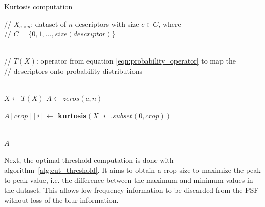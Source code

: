 \begin{algorithm}[H]
	\caption{Kurtosis computation}
	\label{alg:kurtosis_array}
	\begin{algorithmic}[1]
	    \State // $X_{c \times n}$: dataset of $n$ descriptors with size $c \in C$, where \\ // $C = \{0,1,...,size(descriptor)\}$ 
	    
	    \\
	    
	    \State // $T(X)$: operator from equation \ref{eqn:probability_operator} to map the \\ // descriptors onto probability distributions
	   
        \\
        
		\State $X \gets T(X)$
		\State $A \gets zeros(c, n)$
		
		
        		\State $A[crop][i] \gets$ \textbf{kurtosis}$\left(X[i].subset(0, crop)\right)$
		
		    \EndFor
		\EndFor
		
		\\
		
		\Return $A$
	\end{algorithmic}
\end{algorithm}

\noindent Next, the optimal threshold computation is done with algorithm~\ref{alg:cut_threshold}. It aims to obtain a crop size to maximize the peak to peak value, i.e. the difference between the maximum and minimum values in the dataset. This allows low-frequency information to be discarded from the PSF without loss of the blur information.

